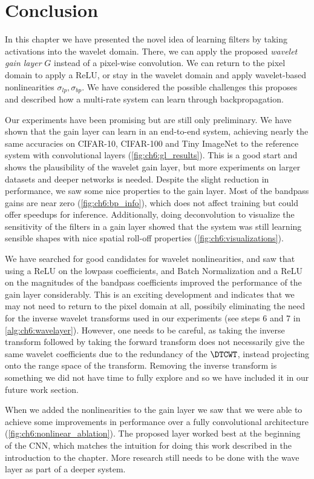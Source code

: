 \section{Conclusion}
In this chapter we have presented the novel idea of learning filters by taking
activations into the wavelet domain. There, we can apply
the proposed \emph{wavelet gain layer} $G$ instead of a pixel-wise convolution. We can
return to the pixel domain to apply a ReLU, or stay in the wavelet domain
and apply wavelet-based nonlinearities $\sigma_{lp}, \sigma_{bp}$. We have
considered the possible challenges this proposes and described how a multi-rate
system can learn through backpropagation.

Our experiments have been promising but are still only preliminary. We have
shown that the gain layer can learn in an end-to-end system, achieving nearly
the same accuracies on CIFAR-10, CIFAR-100 and Tiny ImageNet to the reference system with
convolutional layers (\autoref{fig:ch6:gl_results}). This is a good start and shows the plausibility of
the wavelet gain layer, but more experiments on larger datasets and deeper
networks is needed. Despite the slight reduction in performance, we saw some
nice properties to the gain layer. Most of the bandpass gains are near zero
(\autoref{fig:ch6:bp_info}),
which does not affect training but could offer speedups for inference.
Additionally, doing deconvolution to visualize the sensitivity of the filters in
a gain layer showed that the system was still learning sensible shapes with nice
spatial roll-off properties (\autoref{fig:ch6:visualizations}).

We have searched for good candidates for wavelet nonlinearities, and saw that
using a ReLU on the lowpass coefficients, and
Batch Normalization and a ReLU on the magnitudes of the bandpass coefficients
improved the performance of the gain layer considerably. This is an exciting
development and indicates that we may not need to return to the pixel domain at
all, possibily eliminating the need for the inverse wavelet
transforms used in our experiments (see steps 6 and 7 in
\autoref{alg:ch6:wavelayer}). However, one needs to be careful, as taking the inverse transform
followed by taking the forward transform does not necessarily give the same
wavelet coefficients due to the redundancy of the $\DTCWT$, instead projecting
onto the range space of the transform. Removing the inverse transform is
something we did not have time to fully explore and so we have included it in
our future work section.

When we added the nonlinearities to the gain layer
we saw that we were able to achieve some
improvements in performance over a fully convolutional architecture
(\autoref{fig:ch6:nonlinear_ablation}). The proposed layer
worked best at the beginning of the CNN, which matches the intuition for doing
this work described in the introduction to the chapter. More research still
needs to be done with the wave layer as part of a deeper system.
